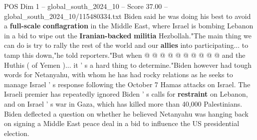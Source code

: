 \begin{textsample}{POS Dim 1 – global\_south\_2024\_10 – Score 37.00 – global\_south\_2024\_10/115480334.txt}
Biden said he was doing his best to avoid a \textbf{full-scale} \textbf{conflagration} in the Middle East, where Israel is bombing Lebanon in a bid to wipe out the \textbf{Iranian-backed} \textbf{militia} Hezbollah."The main thing we can do is try to rally the rest of the world and our \textbf{allies} into participating... to tamp this down,"he told reporters."But when @ @ @ @ @ @ @ @ @ @ and the Huthis ( of Yemen )... it ' s a hard thing to determine."Biden however had tough words for Netanyahu, with whom he has had rocky relations as he seeks to manage Israel ' s response following the October 7 Hamas attacks on Israel.
The Israeli premier has repeatedly ignored Biden ' s calls for \textbf{restraint} on Lebanon, and on Israel ' s war in Gaza, which has killed more than 40,000 Palestinians.
Biden deflected a question on whether he believed Netanyahu was hanging back on signing a Middle East peace deal in a bid to influence the US presidential election.

\end{textsample}
